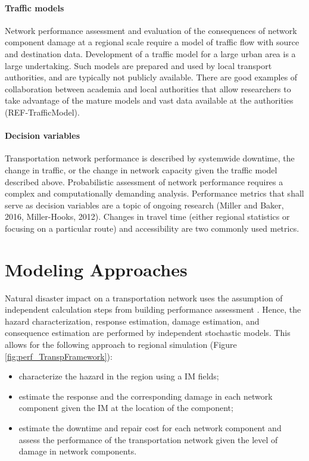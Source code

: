 \paragraph{Traffic models} Network performance assessment and evaluation of the consequences of network component damage at a regional scale require a model of traffic flow with source and destination data. Development of a traffic model for a large urban area is a large undertaking. Such models are prepared and used by local transport authorities, and are typically not publicly available. There are good examples of collaboration between academia and local authorities that allow researchers to take advantage of the mature models and vast data available at the authorities (REF-TrafficModel).

\paragraph{Decision variables} Transportation network performance is described by systemwide downtime, the change in traffic, or the change in network capacity given the traffic model described above. Probabilistic assessment of network performance requires a complex and computationally demanding analysis. Performance metrics that shall serve as decision variables are a topic of ongoing research (Miller and Baker, 2016, Miller-Hooks, 2012). Changes in travel time (either regional statistics or focusing on a particular route) and accessibility are two commonly used metrics.

\section{Modeling Approaches}
\label{sec:perf_transport_methods}

Natural disaster impact on a transportation network uses the assumption of independent calculation steps from building performance assessment \citep{Change et al., 2000, kiremidjian2006pacific, Miller and Baker, 2016}. Hence, the hazard characterization, response estimation, damage estimation, and consequence estimation are performed by independent stochastic models. This allows for the following approach to regional simulation (Figure \ref{fig:perf_TranspFramework}):

\begin{itemize}
    \item characterize the hazard in the region using a IM fields;
    \item estimate the response and the corresponding damage in each network component given the IM at the location of the component;
    \item estimate the downtime and repair cost for each network component and assess the performance of the transportation network given the level of damage in network components.
\end{itemize}

